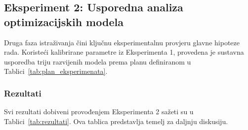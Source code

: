 \subsection{Eksperiment 2: Usporedna analiza optimizacijskih modela}
Druga faza istraživanja čini ključnu eksperimentalnu provjeru glavne hipoteze rada. Koristeći kalibrirane parametre iz Eksperimenta 1, provedena je sustavna usporedba triju razvijenih modela prema planu definiranom u Tablici~\ref{tab:plan_eksperimenata}.

\begin{table}[H]
    \centering
    \caption{Plan naprednih eksperimenata.}
    \label{tab:plan_eksperimenata}
\end{table}

\subsubsection{Rezultati}
Svi rezultati dobiveni provođenjem Eksperimenta 2 sažeti su u Tablici~\ref{tab:rezultati}. Ova tablica predstavlja temelj za daljnju diskusiju.


